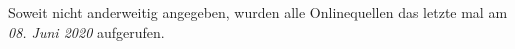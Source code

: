 
{} %
\tableofcontents
{} %
\newpage


\newpage


\pagestyle{scrheadings}
\clearscrheadfoot
\ohead{\rightmark}
\cfoot[\pagemark]{\pagemark}
\setlength{\headsep}{0.5cm}





\newpage


\setcounter{page}{3}
\cleardoublepage
\printbibliography
\vspace{0.5cm}
\begin{flushleft}
Soweit nicht anderweitig angegeben, wurden alle Onlinequellen das letzte mal am \emph{08. Juni 2020} aufgerufen.
\end{flushleft}

\newpage

\renewcommand{\listfigurename}{Abbildungen}
\cleardoublepage
\listoffigures
\newpage

